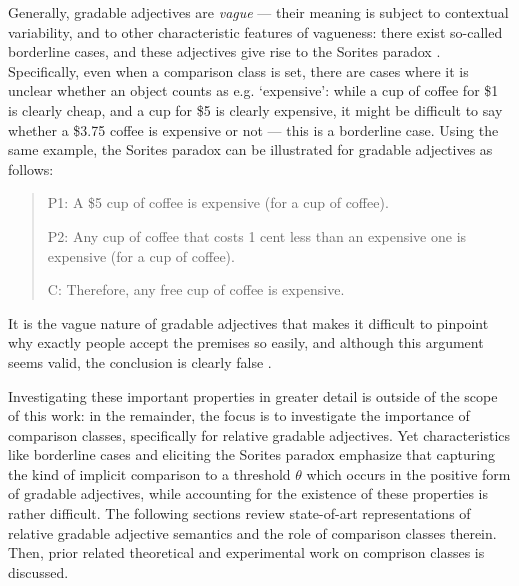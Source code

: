 Generally, gradable adjectives are \textit{vague} --- their meaning is subject to contextual variability, and to other characteristic features of vagueness: there exist so-called borderline cases, and these adjectives give rise to the Sorites paradox \parencite{Kennedy2007}. Specifically, even when a comparison class is set, there are cases where it is unclear whether an object counts as e.g. ‘expensive’: while a cup of coffee for \$1 is clearly cheap, and a cup for \$5 is clearly expensive, it might be difficult to say whether a  \$3.75 coffee is expensive or not --- this is a borderline case. Using the same example, the Sorites paradox can be illustrated for gradable adjectives as follows: 
\begin{quotation}
P1: A \$5 cup of coffee is expensive (for a cup of coffee). 

P2: Any cup of coffee that costs 1 cent less than an expensive one is expensive (for a cup of coffee). 

C: Therefore, any free cup of coffee is expensive. 
\end{quotation}

It is the vague nature of gradable adjectives that makes it difficult to pinpoint why exactly people accept the premises so easily, and although this argument seems valid, the conclusion is clearly false \parencite[see][for more details]{Kennedy2007}.

Investigating these important properties in greater detail is outside of the scope of this work: in the remainder, the focus is to investigate the importance of comparison classes, specifically for relative gradable adjectives. Yet characteristics like borderline cases and eliciting the Sorites paradox emphasize that capturing the kind of implicit comparison to a threshold $\theta$ which occurs in the positive form of gradable adjectives, while accounting for the existence of these properties is rather difficult. 
The following sections review state-of-art representations of relative gradable adjective semantics and the role of comparison classes therein. Then, prior related theoretical and experimental work on comprison classes is discussed. 

